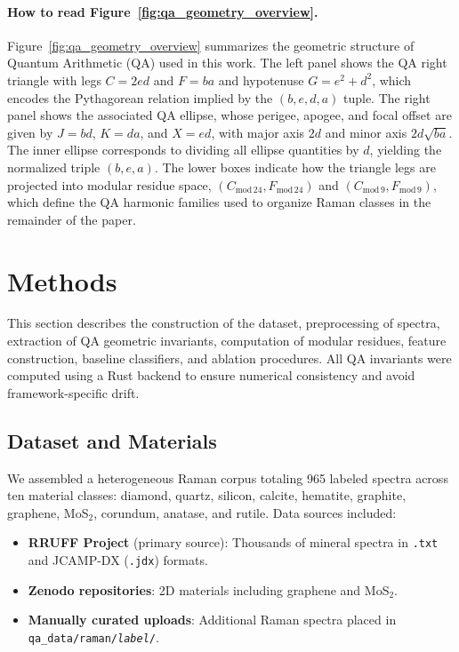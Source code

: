 \documentclass[12pt]{article}
\begin{document}
\paragraph{How to read Figure~\ref{fig:qa_geometry_overview}.}
Figure~\ref{fig:qa_geometry_overview} summarizes the geometric structure of Quantum Arithmetic (QA) used in
this work. The left panel shows the QA right triangle with legs
$C = 2 e d$ and $F = b a$ and hypotenuse $G = e^{2} + d^{2}$, which encodes the Pythagorean relation implied
by the $(b,e,d,a)$ tuple. The right panel shows the associated QA ellipse, whose perigee, apogee, and focal
offset are given by $J = b d$, $K = d a$, and $X = e d$, with major axis $2d$ and minor axis
$2 d \sqrt{b a}$. The inner ellipse corresponds to dividing all ellipse quantities by $d$, yielding the
normalized triple $(b,e,a)$. The lower boxes indicate how the triangle legs are projected into modular
residue space, $(C_{\mathrm{mod}\,24},F_{\mathrm{mod}\,24})$ and $(C_{\mathrm{mod}\,9},F_{\mathrm{mod}\,9})$, which
define the QA harmonic families used to organize Raman classes in the remainder of the paper.

\section{Methods}
\label{sec:methods}

This section describes the construction of the dataset, preprocessing of spectra, extraction of QA geometric
invariants, computation of modular residues, feature construction, baseline classifiers, and ablation
procedures. All QA invariants were computed using a Rust backend to ensure numerical consistency and avoid
framework-specific drift.

\subsection{Dataset and Materials}

We assembled a heterogeneous Raman corpus totaling 965 labeled spectra across ten material classes:
diamond, quartz, silicon, calcite, hematite, graphite, graphene, MoS$_2$, corundum, anatase, and rutile.
Data sources included:

\begin{itemize}
    \item \textbf{RRUFF Project} (primary source): Thousands of mineral spectra in \texttt{.txt} and 
          JCAMP-DX (\texttt{.jdx}) formats.
    \item \textbf{Zenodo repositories}: 2D materials including graphene and MoS$_2$.
    \item \textbf{Manually curated uploads}: Additional Raman spectra placed in
          \texttt{qa\_data/raman/\emph{label}/}.
\end{itemize}
\end{document}
